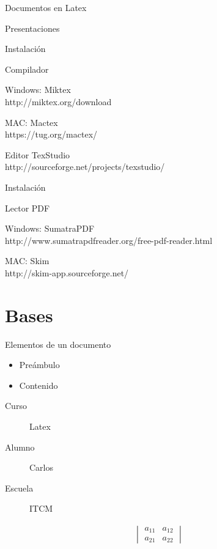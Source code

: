 \documentclass{beamer}
\begin{document}
	\begin{frame}{Documentos en Latex}

	\Huge Presentaciones

	\end{frame}

	\begin{frame}{Instalaci\'on}
		\begin{block}{Compilador}
			\itemize
			\item Windows: Miktex\\
			http://miktex.org/download

			\item MAC: Mactex\\
			https://tug.org/mactex/
		\end{block}

		\begin{block}{Editor}
			TexStudio \\
			http://sourceforge.net/projects/texstudio/
		\end{block}
	\end{frame}

	\begin{frame}{Instalaci\'on}
		\begin{block}{Lector PDF}
			\itemize
			\item Windows: SumatraPDF \\
			http://www.sumatrapdfreader.org/free-pdf-reader.html

			\item MAC: Skim \\
			http://skim-app.sourceforge.net/
		\end{block}
	\end{frame}


	\section{Bases}

	\begin{frame}{Elementos de un documento}
		\begin{itemize}
			\item Preámbulo
			\item Contenido
		\end{itemize}
	\end{frame}


	\begin{frame}
		\begin{description}
			\item[Curso] Latex
			\item[Alumno] Carlos
			\item[Escuela] ITCM
		\end{description}

		\begin{align}
			\begin{vmatrix}
			 a_{11} & a_{12} \\
			 a_{21} & a_{22}
			\end{vmatrix}
		\end{align}

	\end{frame}
\end{document}
